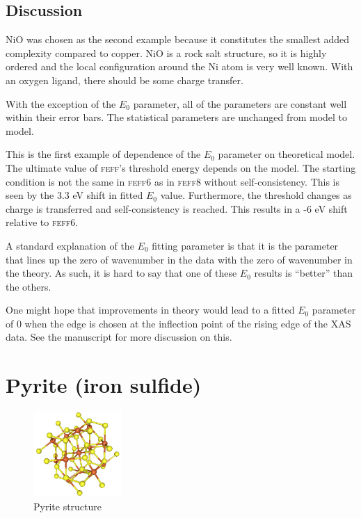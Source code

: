 \documentclass[11pt]{article}
\begin{document}
\subsection{Discussion}
\label{sec:orgheadline12}

NiO was chosen as the second example because it constitutes the smallest
added complexity compared to copper. NiO is a rock salt structure, so it
is highly ordered and the local configuration around the Ni atom is very
well known. With an oxygen ligand, there should be some charge transfer.

With the exception of the $E_0$ parameter, all of the parameters are
constant well within their error bars. The statistical parameters are
unchanged from model to model.

This is the first example of dependence of the $E_0$ parameter on
theoretical model. The ultimate value of \textsc{feff}'s threshold
energy depends on the model. The starting condition is not the same in
\textsc{feff6} as in \textsc{feff8} without self-consistency. This is
seen by the 3.3 eV shift in fitted $E_0$ value. Furthermore, the
threshold changes as charge is transferred and self-consistency is
reached. This results in a -6 eV shift relative to \textsc{feff6}.

A standard explanation of the $E_0$ fitting parameter is that it is the
parameter that lines up the zero of wavenumber in the data with the
zero of wavenumber in the theory. As such, it is hard to say that one
of these $E_0$ results is ``better'' than the others.

One might hope that improvements in theory would lead to a fitted $E_0$
parameter of 0 when the edge is chosen at the inflection point of the
rising edge of the XAS data.  See the manuscript for more discussion
on this.


\section{Pyrite (iron sulfide)}
\label{sec:orgheadline19}

\begin{figure}
  \begin{center}
    \includegraphics[width=0.3\textwidth]{FeS2/FeS2.png}
  \end{center}
  \caption{Pyrite structure}
\end{figure}
\end{document}
